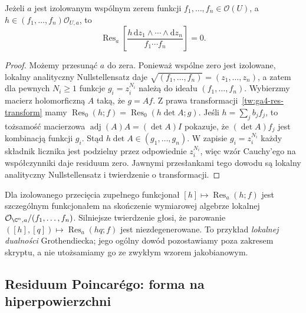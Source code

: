 \begin{stwierdzenie}
\label{st:ga4-res-annihilates}
Jeżeli $a$ jest izolowanym wspólnym zerem funkcji
$f_1,\ldots,f_n\in\mathcal O(U)$, a
$h\in(f_1,\ldots,f_n)\mathcal O_{U,a}$, to
\[
\operatorname{Res}_a\!\left[
\frac{h\,\mathrm dz_1\wedge\cdots\wedge\mathrm dz_n}
{f_1\cdots f_n}\right]=0.
\]
\end{stwierdzenie}
\begin{proof}
Możemy przesunąć $a$ do zera. Ponieważ wspólne zero
jest izolowane, lokalny analityczny Nullstellensatz daje
$\sqrt{(f_1,\ldots,f_n)}=(z_1,\ldots,z_n)$,
a zatem dla pewnych $N_i\ge1$ funkcje $g_i=z_i^{N_i}$
należą do ideału $(f_1,\ldots,f_n)$.
Wybierzmy macierz holomorficzną $A$ taką, że $g=Af$.
Z prawa transformacji~\ref{tw:ga4-res-transform} mamy
$\operatorname{Res}_0(h;f)=\operatorname{Res}_0(h\det A;g)$.
Jeśli $h=\sum_j b_jf_j$, to tożsamość macierzowa
$\operatorname{adj}(A)A=(\det A)I$ pokazuje, że
$(\det A)f_j$ jest kombinacją funkcji $g_i$.
Stąd $h\det A\in(g_1,\ldots,g_n)$.
W zapisie $g_i=z_i^{N_i}$ każdy składnik licznika
jest podzielny przez odpowiednie $z_i^{N_i}$,
więc wzór Cauchy'ego na współczynniki daje residuum zero.
Jawnymi przesłankami tego dowodu są lokalny analityczny
Nullstellensatz i twierdzenie o transformacji.
\end{proof}

\begin{uwaga}
Dla izolowanego przecięcia zupełnego funkcjonał
$[h]\mapsto\operatorname{Res}_a(h;f)$ jest
szczególnym funkcjonałem na skończenie wymiarowej
algebrze lokalnej $\mathcal O_{\C^n,a}/(f_1,\ldots,f_n)$.
Silniejsze twierdzenie głosi, że parowanie
$([h],[q])\mapsto\operatorname{Res}_a(hq;f)$ jest
niezdegenerowane. To przykład \emph{lokalnej dualności}
Grothendiecka; jego ogólny dowód pozostawiamy poza
zakresem skryptu, a nie utożsamiamy go ze zwykłym
wzorem jakobianowym.
\end{uwaga}

\subsection{Residuum Poincarégo: forma na hiperpowierzchni}
\label{subsec:ga4-poincare-res}

